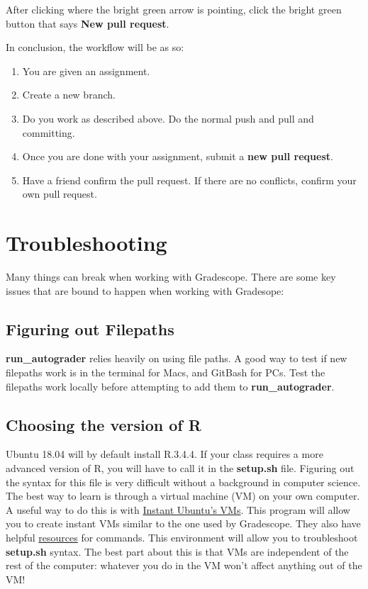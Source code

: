\documentclass[
]{article}
\begin{document}
After clicking where the bright green arrow is pointing, click the
bright green button that says \textbf{New pull request}.

In conclusion, the workflow will be as so:

\begin{enumerate}
\def\labelenumi{\arabic{enumi})}
\item
  You are given an assignment.
\item
  Create a new branch.
\item
  Do you work as described above. Do the normal push and pull and
  committing.
\item
  Once you are done with your assignment, submit a \textbf{new pull
  request}.
\item
  Have a friend confirm the pull request. If there are no conflicts,
  confirm your own pull request.
\end{enumerate}

\hypertarget{troubleshooting}{%
\section{Troubleshooting}\label{troubleshooting}}

Many things can break when working with Gradescope. There are some key
issues that are bound to happen when working with Gradesope:

\hypertarget{figuring-out-filepaths}{%
\subsection{Figuring out Filepaths}\label{figuring-out-filepaths}}

\textbf{run\_autograder} relies heavily on using file paths. A good way
to test if new filepaths work is in the terminal for Macs, and GitBash
for PCs. Test the filepaths work locally before attempting to add them
to \textbf{run\_autograder}.

\hypertarget{choosing-the-version-of-r}{%
\subsection{Choosing the version of R}\label{choosing-the-version-of-r}}

Ubuntu 18.04 will by default install R.3.4.4. If your class requires a
more advanced version of R, you will have to call it in the
\textbf{setup.sh} file. Figuring out the syntax for this file is very
difficult without a background in computer science. The best way to
learn is through a virtual machine (VM) on your own computer. A useful
way to do this is with \href{https://multipass.run/}{Instant Ubuntu's
VMs}. This program will allow you to create instant VMs similar to the
one used by Gradescope. They also have helpful
\href{https://ubuntu.com/server/docs/virtualization-multipass}{resources}
for commands. This environment will allow you to troubleshoot
\textbf{setup.sh} syntax. The best part about this is that VMs are
independent of the rest of the computer: whatever you do in the VM won't
affect anything out of the VM!
\end{document}

